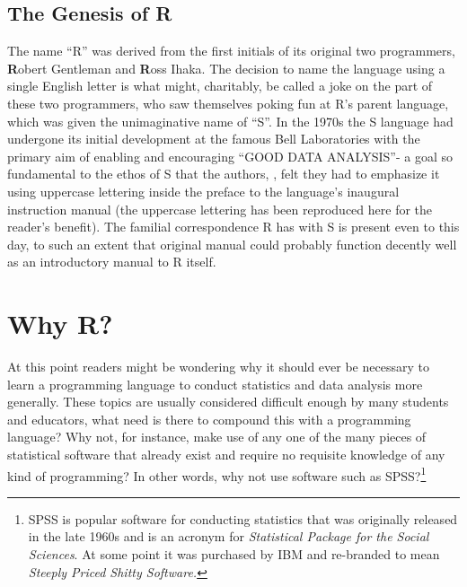 \subsection{The Genesis of R}

The name ``R'' was derived from the first initials of its original two programmers, \textbf{R}obert Gentleman and \textbf{R}oss Ihaka.  The decision to name the language using a single English letter is what might, charitably, be called a joke on the part of these two programmers, who saw themselves poking fun at R's parent language, which was given the unimaginative name of ``S''. In the 1970s the S language had undergone its initial development at the famous Bell Laboratories with the primary aim of enabling and encouraging ``GOOD DATA ANALYSIS''- a goal so fundamental to the ethos of S that the authors, \textcite{Becker1984}, felt they had to emphasize it using uppercase lettering inside the preface to the language's inaugural instruction manual (the uppercase lettering has been reproduced here for the reader's benefit). The familial correspondence R has with S is present even to this day, to such an extent that \textcite{Becker1984} original manual could probably function decently well as an introductory manual to R itself.

\section{Why R?}

At this point readers might be wondering why it should ever be necessary to learn a programming language to conduct statistics and data analysis more generally. These topics are usually considered difficult enough by many students and educators, what need is there to compound this with a programming language? Why not, for instance, make use of any one of the many pieces of statistical software that already exist and require no requisite knowledge of any kind of programming? In other words, why not use software such as SPSS?\footnote{SPSS is popular software for conducting statistics that was originally released in the late 1960s and is an acronym for \textit{Statistical Package for the Social Sciences}. At some point it was purchased by IBM and re-branded to mean \textit{Steeply Priced Shitty Software.}}

